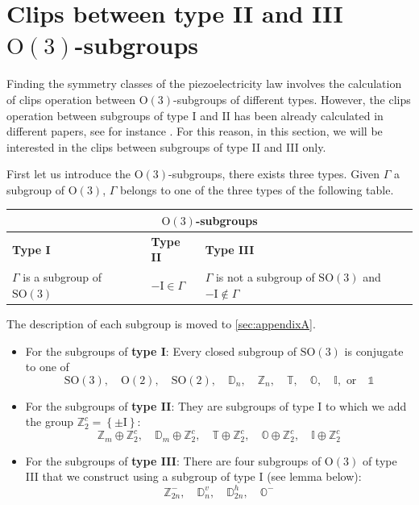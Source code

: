 \documentclass[11pt,a4paper]{amsart}
\theoremstyle{definition}
\newcommand{\ZZ}{\mathbb{Z}}                %
\newcommand{\OO}{\mathrm{O}}                %
\newcommand{\SO}{\mathrm{SO}}               %
\newcommand{\octa}{\mathbb{O}}              %
\newcommand{\ico}{\mathbb{I}}               %
\newcommand{\tetra}{\mathbb{T}}             %
\newcommand{\DD}{\mathbb{D}}                %
\newcommand{\1}{\mathds{1}}		            %
\newcommand{\id}{\mathrm{I}}                %
\newcommand{\set}[1]{\left\{#1\right\}}     %
\begin{document}
\section{Clips between type II and III $\OO(3)$-subgroups}
\par Finding the symmetry classes of the piezoelectricity law involves the calculation of clips operation between $\OO(3)$-subgroups of different types. However, the clips operation between subgroups of type I and II has been already calculated in different papers, see for instance \cite{olive2019}. For this reason, in this section, we will be interested in the clips between subgroups of type II and III only.
\par First let us introduce the $\OO(3)$-subgroups, there exists three types. Given $\Gamma$ a subgroup of $\OO(3)$, $\Gamma$ belongs to one of the three types of the following table.
\bigskip
\begin{center}
\begin{tabular}{ |p{3cm}|p{3cm}|p{3cm}|  }
\hline
\multicolumn{3}{|c|}{$\OO(3)$-subgroups} \\
 \hline
\bf{Type I} & \bf{Type II} & \bf{Type III}\\
 \hline
 $\Gamma$ is a subgroup of $\SO(3)$ & $-\id \in \Gamma$ & $\Gamma$ is not a subgroup of $\SO(3)$ and $-\id \notin \Gamma$\\
 \hline
\end{tabular}
\end{center}
\bigskip

The description of each subgroup is moved to \autoref{sec:appendixA}.
\begin{itemize}
\item For the subgroups of \textbf{type I}: Every closed subgroup of $\SO(3)$ is conjugate to one of
\begin{equation*}
\SO(3),\quad \OO(2),\quad \SO(2), \quad \DD_n, \quad \ZZ_n, \quad \tetra, \quad \octa, \quad \ico, \text{ or} \quad \1
\end{equation*}
\item For the subgroups of \textbf{type II}: They are subgroups of type I to which we add the group $\ZZ_2^c=\set{\pm \id}$:
\begin{equation*}
\ZZ_m\oplus \ZZ_2^c,\quad \DD_m\oplus \ZZ_2^c,\quad \tetra\oplus \ZZ_2^c,\quad \octa\oplus \ZZ_2^c, \quad \ico\oplus \ZZ_2^c
\end{equation*}
\item For the subgroups of \textbf{type III}: There are four subgroups of $\OO(3)$ of type III that we construct using a subgroup of type I (see lemma below):
\begin{equation*}
\ZZ_{2n}^-,\quad \DD_n^v,\quad \DD_{2n}^h,\quad \octa^-
\end{equation*}
\end{itemize}
\end{document}
